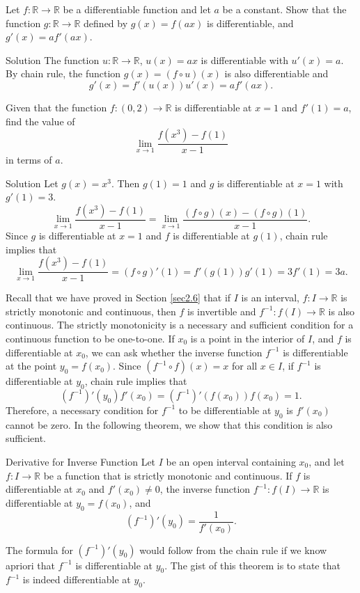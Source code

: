 \begin{example}
{}
Let $f:\mathbb{R}\to\mathbb{R}$ be a differentiable function and let $a$ be a constant. Show that the function $g:\mathbb{R}\to\mathbb{R}$ defined by $g(x)=f(ax)$ is differentiable, and $g'(x)=af'(ax)$.



\end{example}
\begin{solution}{Solution}
The function $u:\mathbb{R}\to\mathbb{R}$, $u(x)=ax$ is differentiable with $u'(x)=a$. By  chain rule, the function $g(x)=(f\circ u)(x)$ is also differentiable and
\[g'(x)=f'(u(x))u'(x)=af'(ax).\]
\end{solution}

\begin{example}{}
Given that the function $f:(0,2)\to \mathbb{R}$ is differentiable at $x=1$ and $f'(1)=a$, find the value of
\[\lim_{x\rightarrow 1}\frac{f(x^3)-f(1)}{x-1}\] in terms of $a$.
\end{example}
\begin{solution}{Solution}
Let $g(x)=x^3$. Then $g(1)=1$ and $g$ is differentiable at $x=1$ with $g'(1)=3$.
\[\lim_{x\rightarrow 1}\frac{f(x^3)-f(1)}{x-1}=\lim_{x\rightarrow 1}\frac{(f\circ g)(x )-(f\circ g)(1)}{x-1}.\]
Since $g$ is differentiable at $x=1$ and  $f$ is differentiable at $g(1)$,   chain rule implies that
\[\lim_{x\rightarrow 1}\frac{f(x^3)-f(1)}{x-1}=(f\circ g)'(1)=f'(g(1))g'(1)=3f'(1)=3a.\]
\end{solution}

Recall that we have proved in Section \ref{sec2.6} that if $I$ is an interval, $f:I\to\mathbb{R}$ is strictly monotonic and continuous, then $f$ is invertible and $f^{-1}:f(I)\to \mathbb{R}$ is also continuous. The strictly monotonicity is a necessary and sufficient condition for a continuous function to be one-to-one. If $x_0$ is a point in the interior of $I$, and $f$ is differentiable at $x_0$, we can ask whether the inverse function $f^{-1}$ is differentiable at the point $y_0=f(x_0)$. 
Since $(f^{-1}\circ f)(x)=x$ for all $x\in I$, if $f^{-1}$ is differentiable at $y_0$,  chain rule implies that
\[(f^{-1})'(y_0)f'(x_0)=(f^{-1})'(f(x_0))f(x_0)=1.\]
Therefore, a necessary condition for $f^{-1}$ to be differentiable at $y_0$ is $f'(x_0)$ cannot be zero. In the following theorem, we show that this condition is also sufficient. 

\begin{theorem}[label=thm230218_9]{Derivative for Inverse Function}
Let $I$ be an open interval containing   $x_0$, and let $f:I\rightarrow\mathbb{R}$ be a function that is strictly monotonic  and continuous. If $f$ is differentiable at $x_0$ and $f'(x_0)\neq 0$, the inverse function $f^{-1}:f(I)\to \mathbb{R}$ is differentiable at $y_0=f(x_0)$, and 
\[(f^{-1})'(y_0)=\frac{1}{f'(x_0)}.\]
\end{theorem}
The formula for $(f^{-1})'(y_0)$ would follow from the chain rule if we know apriori that $f^{-1}$ is   differentiable at $y_0$. The gist of this theorem is to state that $f^{-1}$ is indeed differentiable at $y_0$.

